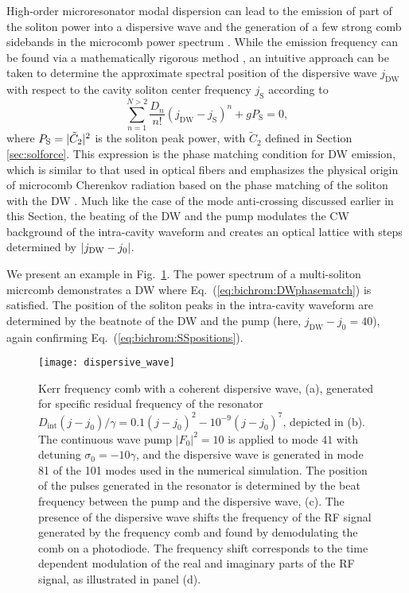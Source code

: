 High-order microresonator modal dispersion can lead to the emission of part of the soliton power into a dispersive wave and the generation of a few strong comb sidebands in the microcomb power spectrum \cite{milian2014soliton, taheri2016highorderdisp}. While the emission frequency can be found via a mathematically rigorous method \cite{milian2014soliton}, an intuitive approach can be taken to determine the approximate spectral position of the dispersive wave $j_\mathrm{DW}$ with respect to the cavity soliton center frequency $j_\mathrm{S}$ according to
%
\begin{equation}\label{eq:bichrom:DWphasematch}
\sum_{n = 1}^{N>2} \frac{D_n}{n!}(j_\mathrm{DW}-j_\mathrm{S})^n + g P_\mathrm{S} = 0,
\end{equation}
%
where $P_\mathrm{S} = \lvert\tilde{C}_2\rvert^2$ is the soliton peak power, with $\tilde{C}_2$ defined in Section \ref{sec:solforce}. This expression is the phase matching condition for DW emission, which is similar to that used in optical fibers \cite{agrawal2013NLfiber} and emphasizes the physical origin of microcomb Cherenkov radiation based on the phase matching of the soliton with the DW \cite{akhmediev1995cherenkov}. Much like the case of the mode anti-crossing discussed earlier in this Section, the beating of the DW and the pump modulates the CW background of the intra-cavity waveform and creates an optical lattice with steps determined by $\lvert j_\mathrm{DW}-j_0\rvert$.

We present an example in Fig.~\ref{fig:DW}. The power spectrum of a multi-soliton micrcomb demonstrates a DW where Eq.~(\ref{eq:bichrom:DWphasematch}) is satisfied. The position of the soliton peaks in the intra-cavity waveform are determined by the beatnote of the DW and the pump (here, $j_\mathrm{DW}-j_0 = 40$), again confirming Eq.~(\ref{eq:bichrom:SSpositions}).

%
\begin{figure}[tb]
  \centering
  \texttt{[image: dispersive\_wave]}
\caption{ \small Kerr frequency comb with a coherent dispersive wave, (a), generated for specific residual frequency of the resonator $D_\mathrm{int}(j-j_0)/\gamma=0.1(j - j_0)^2 - 10^{-9}(j - j_0)^7$, depicted in (b). The continuous wave pump $|F_0|^2=10$ is applied to mode $41$ with detuning $\sigma_0 = -10 \gamma$, and the dispersive wave is generated in mode 81 of the 101 modes used in the numerical simulation. The position of the pulses generated in the resonator is determined by the beat frequency between the pump and the dispersive wave, (c). The presence of the dispersive wave shifts the frequency of the RF signal generated by the frequency comb and found by demodulating the comb on a photodiode. The frequency shift corresponds to the time dependent modulation of the real and imaginary parts of the RF signal, as illustrated in panel (d).
} \label{fig:DW}
\end{figure}
%


